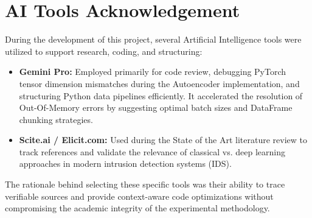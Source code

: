 \section{AI Tools Acknowledgement}
During the development of this project, several Artificial Intelligence tools were utilized to support research, coding, and structuring:

\begin{itemize}
    \item \textbf{Gemini Pro:} Employed primarily for code review, debugging PyTorch tensor dimension mismatches during the Autoencoder implementation, and structuring Python data pipelines efficiently. It accelerated the resolution of Out-Of-Memory errors by suggesting optimal batch sizes and DataFrame chunking strategies.
    \item \textbf{Scite.ai / Elicit.com:} Used during the State of the Art literature review to track references and validate the relevance of classical vs. deep learning approaches in modern intrusion detection systems (IDS).
\end{itemize}
The rationale behind selecting these specific tools was their ability to trace verifiable sources and provide context-aware code optimizations without compromising the academic integrity of the experimental methodology.
